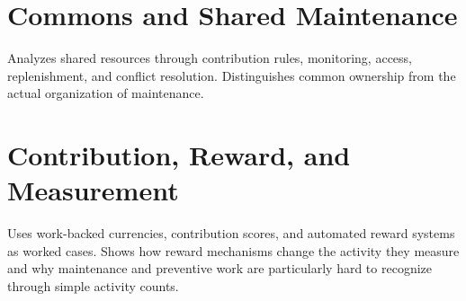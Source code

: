 \chapter{Commons and Shared Maintenance}\label{ch:34}
Analyzes shared resources through contribution rules, monitoring, access, replenishment, and conflict resolution. Distinguishes common ownership from the actual organization of maintenance.
\scaffold

\chapter{Contribution, Reward, and Measurement}\label{ch:35}
Uses work-backed currencies, contribution scores, and automated reward systems as worked cases. Shows how reward mechanisms change the activity they measure and why maintenance and preventive work are particularly hard to recognize through simple activity counts.
\scaffold
